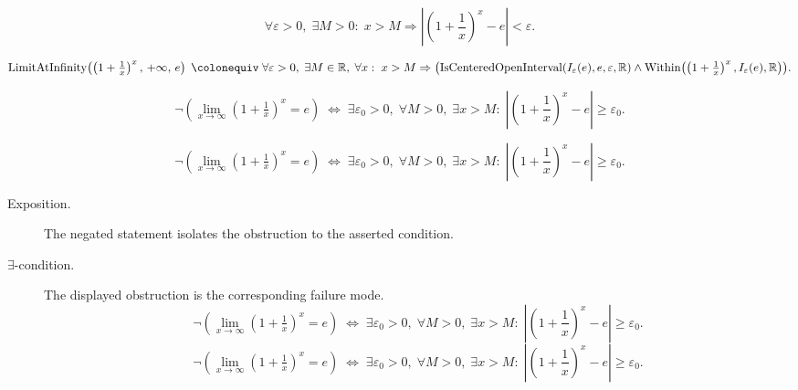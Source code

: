 \begin{remark*}
\[
  \forall\varepsilon>0,\;\exists M>0:\;
  x>M \Rightarrow
  \left|\!\left(1+\frac{1}{x}\right)^x - e\right| < \varepsilon.
\]
\end{remark*}

\begin{remark*}
\[
  \operatorname{LimitAtInfinity}\!\left(\left(1+\tfrac{1}{x}\right)^x,\,+\infty,\,e\right)
  \;\colonequiv\;
  \forall\varepsilon>0,\;\exists M\in\mathbb{R},\;\forall x:\;
  x>M \Rightarrow
  \bigl(
    \operatorname{IsCenteredOpenInterval}(I_\varepsilon(e),e,\varepsilon,\mathbb R)
    \wedge
    \operatorname{Within}\!\left(\left(1+\tfrac{1}{x}\right)^x,I_\varepsilon(e),\mathbb R\right)
  \bigr).
\]
\end{remark*}

\begin{remark*}
\[
  \neg\left(\lim_{x\to\infty}\!\left(1+\tfrac{1}{x}\right)^x=e\right)
  \;\iff\;
  \exists\varepsilon_0>0,\;\forall M>0,\;\exists x>M:\;
  \left|\!\left(1+\frac{1}{x}\right)^x - e\right|\geq\varepsilon_0.
\]
\end{remark*}

\begin{remark*}
\[
\neg\left(\lim_{x\to\infty}\!\left(1+\tfrac{1}{x}\right)^x=e\right)
  \;\iff\;
  \exists\varepsilon_0>0,\;\forall M>0,\;\exists x>M:\;
  \left|\!\left(1+\frac{1}{x}\right)^x - e\right|\geq\varepsilon_0.
\]
\end{remark*}

\begin{remark*}
\begin{description}
  \item[Exposition.]
  The negated statement isolates the obstruction to the asserted condition.

  \item[\(\exists\)-condition.]
  The displayed obstruction is the corresponding failure mode.
  \[
\neg\left(\lim_{x\to\infty}\!\left(1+\tfrac{1}{x}\right)^x=e\right)
  \;\iff\;
  \exists\varepsilon_0>0,\;\forall M>0,\;\exists x>M:\;
  \left|\!\left(1+\frac{1}{x}\right)^x - e\right|\geq\varepsilon_0.
  \]
  \[
\neg\left(\lim_{x\to\infty}\!\left(1+\tfrac{1}{x}\right)^x=e\right)
  \;\iff\;
  \exists\varepsilon_0>0,\;\forall M>0,\;\exists x>M:\;
  \left|\!\left(1+\frac{1}{x}\right)^x - e\right|\geq\varepsilon_0.
  \]
\end{description}
\end{remark*}



